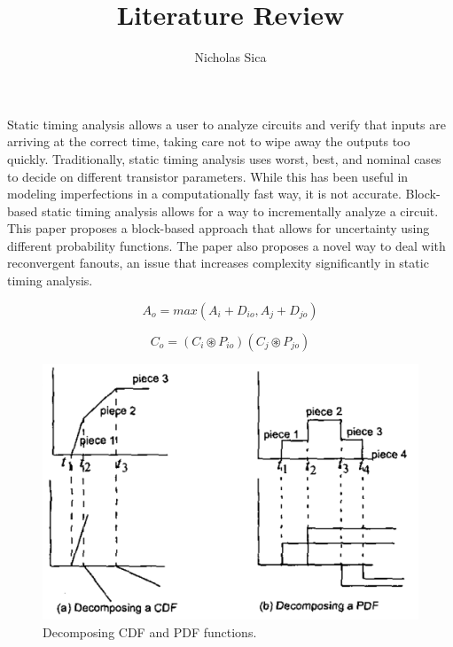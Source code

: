 \documentclass[journal,12pt]{IEEEtran}
\title{Literature Review}
\author{Nicholas Sica}
\begin{document}
\maketitle
Static timing analysis allows a user to analyze circuits and verify
that inputs are arriving at the correct time, taking care not to wipe
away the outputs too quickly. Traditionally, static timing analysis
uses worst, best, and nominal cases to decide on different transistor parameters. While this has
been useful in modeling imperfections in a computationally fast way,
it is not accurate. Block-based static timing analysis allows for a
way to incrementally analyze a circuit. This paper proposes a
block-based approach that allows for uncertainty using different
probability functions. The paper also proposes a novel way to deal
with reconvergent fanouts, an issue that increases complexity
significantly in static timing analysis.

\begin{equation}\label{eq:max_orig}
  A_o = max(A_i + D_{io}, A_j + D_{jo})
\end{equation}

\begin{equation}\label{eq:max}
  C_o = (C_i \circledast P_{io})(C_j \circledast P_{jo})
\end{equation}

\begin{figure}
  \centering
  \includegraphics[width=0.95\columnwidth]{decomposed_graphs.png}
  \caption{Decomposing CDF and PDF functions.}\label{fig:decompose}
\end{figure}
\end{document}
